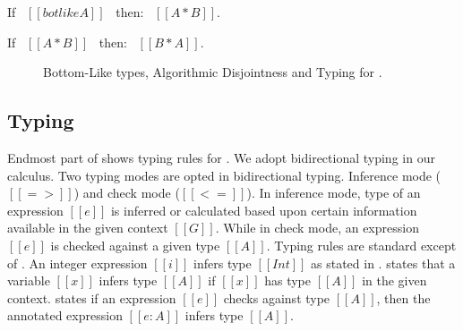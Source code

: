 \begin{lemma}
  If \ $[[botlike A]]$ \ then: \ $[[A * B]]$.
\label{lemma:union:bl-disjoint}
\end{lemma}

\begin{lemma}
  If \ $[[A * B]]$ \ then: \ $[[B * A]]$.
\label{lemma:union:disj-sym}
\end{lemma}


\begin{figure}[t]
  \begin{small}
    \centering
  \end{small}
  \begin{small}
    \centering
  \end{small}
  \begin{small}
    \centering
  \end{small}
  \caption{Bottom-Like types, Algorithmic Disjointness and Typing for \cal.}
  \label{fig:union:disj-typ}
\end{figure}


\subsection{Typing}
\label{sec:union:typ}
Endmost part of  shows typing rules for \cal.
We adopt bidirectional typing in our calculus.
Two typing modes are opted in bidirectional typing. Inference mode ($[[=>]]$) and check mode ($[[<=]]$).
In inference mode, type of an expression $[[e]]$ is inferred or calculated based upon certain information
available in the given context $[[G]]$. 
While in check mode, an expression $[[e]]$ is checked against a given type $[[A]]$.
Typing rules are standard except of .
An integer expression $[[i]]$ infers type $[[Int]]$ as stated in .
 states that a variable $[[x]]$ infers type $[[A]]$ if $[[x]]$ has type $[[A]]$ in the 
given context.  states if an expression $[[e]]$ checks against type $[[A]]$, then the
annotated expression $[[e:A]]$ infers type $[[A]]$.

